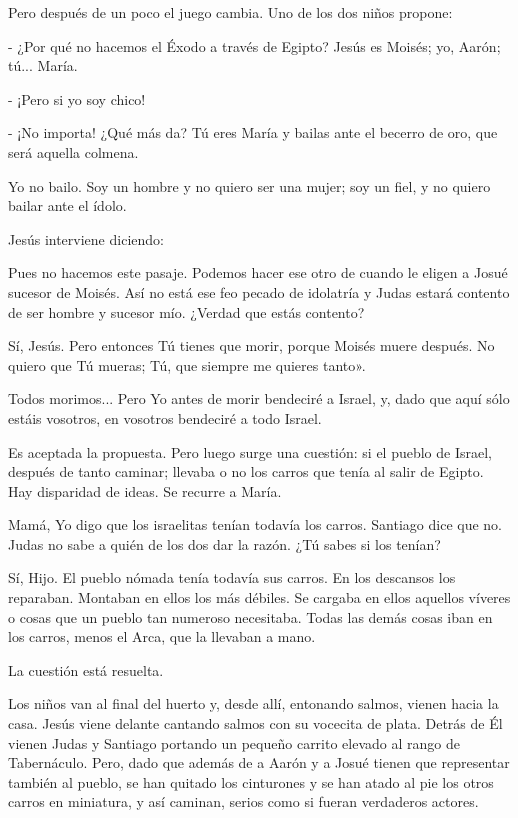 \documentclass[12pt, twoside, openright]{book} %
\begin{document}
Pero después de un poco el juego cambia. Uno de los dos niños propone: 

- ¿Por qué no hacemos el Éxodo a través de Egipto? Jesús es Moisés; yo, Aarón; tú... María. 

- ¡Pero si yo soy chico! 

- ¡No importa! ¿Qué más da? Tú eres María y bailas ante el becerro de oro, que será aquella colmena. 

Yo no bailo. Soy un hombre y no quiero ser una mujer; soy un fiel, y no quiero bailar ante el ídolo. 

Jesús interviene diciendo: 

Pues no hacemos este pasaje. Podemos hacer ese otro de cuando le eligen a Josué sucesor de Moisés. Así no está ese feo pecado de idolatría y Judas estará contento de ser hombre y sucesor mío. ¿Verdad que estás contento? 

Sí, Jesús. Pero entonces Tú tienes que morir, porque Moisés muere después. No quiero que Tú mueras; Tú, que siempre me quieres tanto». 

Todos morimos... Pero Yo antes de morir bendeciré a Israel, y, dado que aquí sólo estáis vosotros, en vosotros bendeciré a todo Israel. 

Es aceptada la propuesta. Pero luego surge una cuestión: si el pueblo de Israel, después de tanto caminar; llevaba o no los carros que tenía al salir de Egipto. Hay disparidad de ideas. Se recurre a María. 

Mamá, Yo digo que los israelitas tenían todavía los carros. Santiago dice que no. Judas no sabe a quién de los dos dar la razón. ¿Tú sabes si los tenían? 

Sí, Hijo. El pueblo nómada tenía todavía sus carros. En los descansos los reparaban. Montaban en ellos los más débiles. Se cargaba en ellos aquellos víveres o cosas que un pueblo tan numeroso necesitaba. Todas las demás cosas iban en los carros, menos el Arca, que la llevaban a mano. 

La cuestión está resuelta. 

Los niños van al final del huerto y, desde allí, entonando salmos, vienen hacia la casa. Jesús viene delante cantando salmos con su vocecita de plata. Detrás de Él vienen Judas y Santiago portando un pequeño carrito elevado al rango de Tabernáculo. Pero, dado que además de a Aarón y a Josué tienen que representar también al pueblo, se han quitado los cinturones y se han atado al pie los otros carros en miniatura, y así caminan, serios como si fueran verdaderos actores. 
\end{document}
